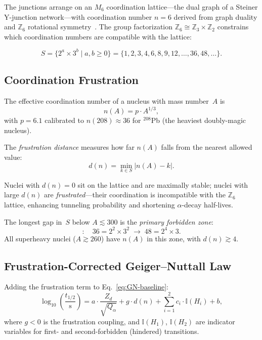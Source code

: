 \documentclass[12pt,a4paper,twocolumn]{revtex4-2}
\newcommand{\thalf}{t_{1/2}}
\newcommand{\Qalpha}{Q_\alpha}
\newcommand{\Zd}{Z_d}
\newcommand{\dn}{d(n)}
\begin{document}
The junctions arrange on an $M_6$ coordination lattice---the dual
graph of a Steiner Y-junction network---with coordination number
$n = 6$ derived from graph duality and $\mathbb{Z}_6$ rotational
symmetry~\cite{EDCBook4}.  The group factorization
$\mathbb{Z}_6 \cong \mathbb{Z}_3 \times \mathbb{Z}_2$ constrains
which coordination numbers are compatible with the lattice:

\begin{equation}
  S = \{2^a \times 3^b \mid a, b \geq 0\}
    = \{1, 2, 3, 4, 6, 8, 9, 12, \ldots, 36, 48, \ldots\}.
  \label{eq:S}
\end{equation}

\subsection{Coordination Frustration}

The effective coordination number of a nucleus with mass number~$A$
is
\begin{equation}
  n(A) = p \cdot A^{1/3},
  \label{eq:nA}
\end{equation}
with $p = 6.1$ calibrated to $n(208) \approx 36$ for
${}^{208}$Pb (the heaviest doubly-magic nucleus).

The \emph{frustration distance} measures how far $n(A)$ falls from
the nearest allowed value:
\begin{equation}
  \dn = \min_{k \in S} |n(A) - k|.
  \label{eq:dn}
\end{equation}

Nuclei with $\dn = 0$ sit on the lattice and are maximally stable;
nuclei with large $\dn$ are \emph{frustrated}---their coordination
is incompatible with the $\mathbb{Z}_6$ lattice, enhancing
tunneling probability and shortening $\alpha$-decay half-lives.

The longest gap in~$S$ below $A \lesssim 300$ is the
\emph{primary forbidden zone}:
\begin{equation}
  [37, 47]: \quad
  36 = 2^2 \times 3^2 \;\to\; 48 = 2^4 \times 3.
  \label{eq:forbidden}
\end{equation}
All superheavy nuclei ($A \gtrsim 260$) have $n(A)$ in this zone,
with $\dn \gtrsim 4$.

\subsection{Frustration-Corrected Geiger--Nuttall Law}

Adding the frustration term to Eq.~\eqref{eq:GN-baseline}:
\begin{equation}
  \log_{10}\!\left(\frac{\thalf}{\text{s}}\right)
    = a \cdot \frac{\Zd}{\sqrt{\Qalpha}}
    + g \cdot \dn
    + \sum_{i=1}^{2} c_i \cdot \mathbb{I}(H_i)
    + b,
  \label{eq:GN-corrected}
\end{equation}
where $g < 0$ is the frustration coupling, and
$\mathbb{I}(H_1)$, $\mathbb{I}(H_2)$ are indicator variables for
first- and second-forbidden (hindered) transitions.
\end{document}
